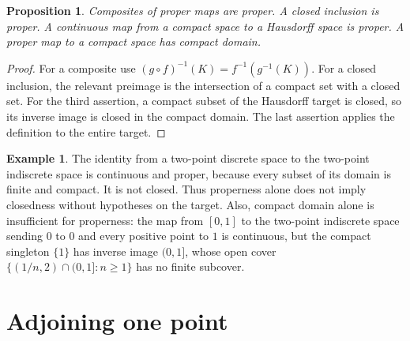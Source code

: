 \documentclass[11pt,oneside,openany]{book}
\newtheorem{proposition}[theorem]{Proposition}
\theoremstyle{definition}
\newtheorem{example}[theorem]{Example}
\theoremstyle{remark}
\begin{document}
\begin{proposition}\label{d10:11:proper-calculus}
Composites of proper maps are proper. A closed inclusion is proper. A continuous map from a compact space to a Hausdorff space is proper. A proper map to a compact space has compact domain.
\end{proposition}
\begin{proof}
For a composite use $(g\circ f)^{-1}(K)=f^{-1}(g^{-1}(K))$. For a closed inclusion, the relevant preimage is the intersection of a compact set with a closed set. For the third assertion, a compact subset of the Hausdorff target is closed, so its inverse image is closed in the compact domain. The last assertion applies the definition to the entire target.
\end{proof}

\begin{example}\label{d10:11:proper-boundary}
The identity from a two-point discrete space to the two-point indiscrete space is continuous and proper, because every subset of its domain is finite and compact. It is not closed. Thus properness alone does not imply closedness without hypotheses on the target. Also, compact domain alone is insufficient for properness: the map from $[0,1]$ to the two-point indiscrete space sending $0$ to $0$ and every positive point to $1$ is continuous, but the compact singleton $\{1\}$ has inverse image $(0,1]$, whose open cover $\{(1/n,2)\cap(0,1]:n\geq1\}$ has no finite subcover.
\end{example}

\section{Adjoining one point}
\end{document}
